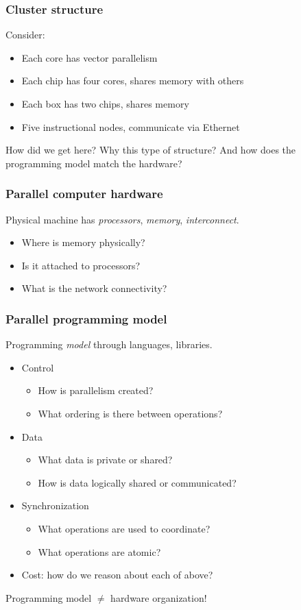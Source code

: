 \documentclass{beamer}
\begin{document}
\begin{frame}
  \frametitle{Cluster structure}

  Consider:
  \begin{itemize}
  \item Each core has vector parallelism
  \item Each chip has four cores, shares memory with others
  \item Each box has two chips, shares memory
  \item Five instructional nodes, communicate via Ethernet
  \end{itemize}
  How did we get here? Why this type of structure?  And how does the
  programming model match the hardware?

\end{frame}


\begin{frame}
  \frametitle{Parallel computer hardware}
  
  Physical machine has {\em processors}, {\em memory}, {\em interconnect}.
  \begin{itemize}
  \item Where is memory physically?
  \item Is it attached to processors?
  \item What is the network connectivity?
  \end{itemize}
\end{frame}


\begin{frame}
  \frametitle{Parallel programming model}
  
  Programming {\em model} through languages, libraries.
  \begin{itemize}
  \item
    Control
    \begin{itemize}
      \item How is parallelism created?
      \item What ordering is there between operations?
    \end{itemize}
  \item
    Data
    \begin{itemize}
      \item What data is private or shared?
      \item How is data logically shared or communicated?
    \end{itemize}
  \item
    Synchronization
    \begin{itemize}
      \item What operations are used to coordinate?
      \item What operations are atomic?
    \end{itemize}
  \item
    Cost: how do we reason about each of above?
  \end{itemize}

  \vspace{5mm}
  Programming model $\neq$ hardware organization!
\end{frame}
\end{document}

